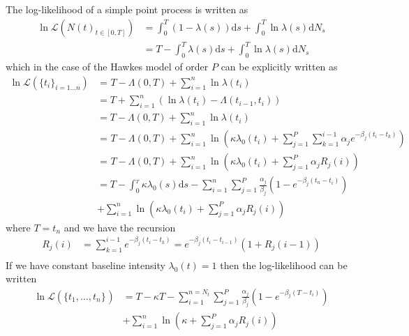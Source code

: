 \documentclass{amsart}
\newcommand{\mathd}{\mathrm{d}}
\begin{document}
The log-likelihood of a simple point process is written as
\begin{equation}
  \begin{array}{ll}
    \text{} \ln \mathcal{L} ( N ( t)_{t \in [ 0, T]}) & = \int_0^T ( 1 -
    \lambda ( s)) \mathd s + \int_0^T \ln \lambda ( s) \mathd N_s\\
    & = T - \int_0^T \lambda ( s) \mathd s + \int_0^T \ln \lambda ( s) \mathd
    N_s
  \end{array}
\end{equation}
which in the case of the Hawkes model of order $P$ can be explicitly written
{\cite{ozaki1979maximum}} as
\begin{equation}
  \begin{array}{ll}
    \ln \mathcal{L} ( \{ t_i \}_{i = 1 \ldots n}) & =_{} T - \Lambda ( 0, T) +
    \sum_{i = 1}^n \ln \lambda ( t_i)\\
    & = T + \sum_{i = 1}^n ( \ln \lambda ( t_i) - \Lambda ( t_{i - 1},
    t_i))\\
    & = T - \Lambda ( 0, T) + \sum_{i = 1}^n \ln \lambda ( t_i)\\
    & =_{} T - \Lambda ( 0, T) + \sum_{i = 1}^n \ln \left( \kappa \lambda_0 (
    t_i) + \sum_{j = 1}^P \sum_{k = 1}^{i - 1} \alpha_j e^{- \beta_j ( t_i -
    t_k)} \right)\\
    & =_{} T - \Lambda ( 0, T) + \sum_{i = 1}^n \ln \left( \kappa \lambda_0 (
    t_i) + \sum_{j = 1}^P \alpha_j R_j ( i) \right)\\
    & = T - \int_0^{_T} \kappa \lambda_0 ( s) \mathd s - \sum_{i = 1}^n
    \sum_{j = 1}^P \frac{\alpha_j}{\beta_j} ( 1 - e^{- \beta_j ( t_n -
    t_i)})\\
    & + \sum_{i = 1}^n \ln \left( \kappa \lambda_0 ( t_i) + \sum_{j = 1}^P
    \alpha_j R_j ( i) \right)
  \end{array}
\end{equation}
where $T = t_n$ and we have the recursion{\cite{ogata1981lewis}}
\begin{equation}
  \begin{array}{ll}
    R_j ( i) & = \sum_{k = 1}^{i - 1} e^{- \beta_j ( t_i - t_k)} = e^{-
    \beta_j ( t_i - t_{i - 1})} ( 1 + R_j ( i - 1))\\
    & 
  \end{array}
\end{equation}
If we have constant baseline intensity $\lambda_0 ( t) = 1$ then the
log-likelihood can be written
\begin{equation}
  \begin{array}{ll}
    \ln \mathcal{L} ( \{ t_1, \ldots, t_n \}_{}) & = T - \kappa T - \sum_{i =
    1}^{n = N_t} \sum_{j = 1}^P \frac{\alpha_j}{\beta_j} ( 1 - e^{- \beta_j (
    T - t_i)})\\
    & + \sum_{i = 1}^n \ln \left( \kappa + \sum_{j = 1}^P \alpha_j R_j ( i)
    \right)
  \end{array} \text{} \label{hawkesll}
\end{equation}
\end{document}
